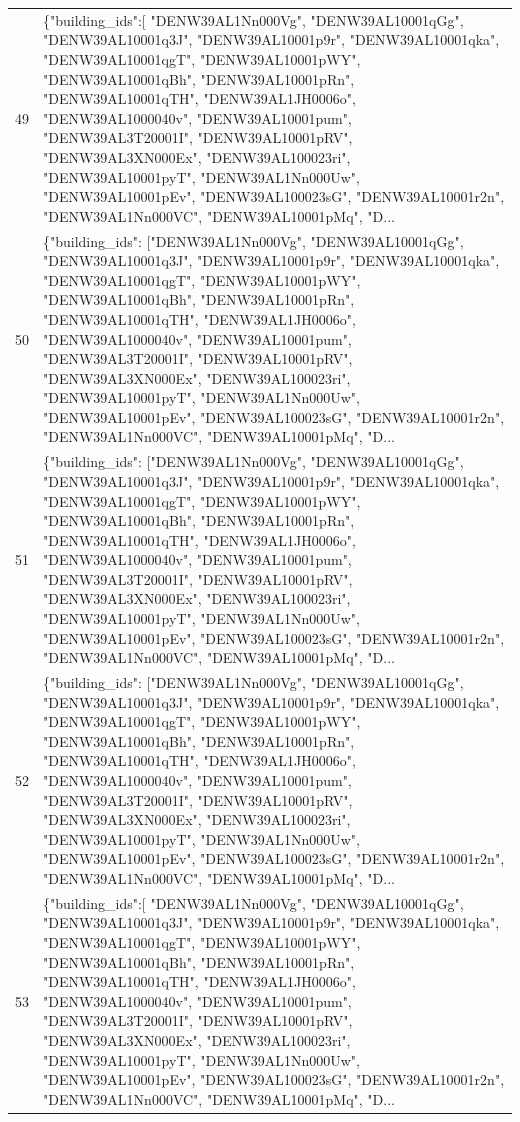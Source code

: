 \documentclass[a4paper,11pt]{article}
\begin{document}
\begin{table}[ht]
\begin{tabular}{r p{12cm}}
49 & \{"building\_ids":[ "DENW39AL1Nn000Vg", "DENW39AL10001qGg", "DENW39AL10001q3J", "DENW39AL10001p9r", "DENW39AL10001qka", "DENW39AL10001qgT", "DENW39AL10001pWY", "DENW39AL10001qBh", "DENW39AL10001pRn", "DENW39AL10001qTH", "DENW39AL1JH0006o", "DENW39AL1000040v", "DENW39AL10001pum", "DENW39AL3T20001I", "DENW39AL10001pRV", "DENW39AL3XN000Ex", "DENW39AL100023ri", "DENW39AL10001pyT", "DENW39AL1Nn000Uw", "DENW39AL10001pEv", "DENW39AL100023sG", "DENW39AL10001r2n", "DENW39AL1Nn000VC", "DENW39AL10001pMq", "D... \\
50 & \{"building\_ids": ["DENW39AL1Nn000Vg", "DENW39AL10001qGg", "DENW39AL10001q3J", "DENW39AL10001p9r", "DENW39AL10001qka", "DENW39AL10001qgT", "DENW39AL10001pWY", "DENW39AL10001qBh", "DENW39AL10001pRn", "DENW39AL10001qTH", "DENW39AL1JH0006o", "DENW39AL1000040v", "DENW39AL10001pum", "DENW39AL3T20001I", "DENW39AL10001pRV", "DENW39AL3XN000Ex", "DENW39AL100023ri", "DENW39AL10001pyT", "DENW39AL1Nn000Uw", "DENW39AL10001pEv", "DENW39AL100023sG", "DENW39AL10001r2n", "DENW39AL1Nn000VC", "DENW39AL10001pMq", "D... \\
51 & \{"building\_ids": ["DENW39AL1Nn000Vg", "DENW39AL10001qGg", "DENW39AL10001q3J", "DENW39AL10001p9r", "DENW39AL10001qka", "DENW39AL10001qgT", "DENW39AL10001pWY", "DENW39AL10001qBh", "DENW39AL10001pRn", "DENW39AL10001qTH", "DENW39AL1JH0006o", "DENW39AL1000040v", "DENW39AL10001pum", "DENW39AL3T20001I", "DENW39AL10001pRV", "DENW39AL3XN000Ex", "DENW39AL100023ri", "DENW39AL10001pyT", "DENW39AL1Nn000Uw", "DENW39AL10001pEv", "DENW39AL100023sG", "DENW39AL10001r2n", "DENW39AL1Nn000VC", "DENW39AL10001pMq", "D... \\
52 & \{"building\_ids": ["DENW39AL1Nn000Vg", "DENW39AL10001qGg", "DENW39AL10001q3J", "DENW39AL10001p9r", "DENW39AL10001qka", "DENW39AL10001qgT", "DENW39AL10001pWY", "DENW39AL10001qBh", "DENW39AL10001pRn", "DENW39AL10001qTH", "DENW39AL1JH0006o", "DENW39AL1000040v", "DENW39AL10001pum", "DENW39AL3T20001I", "DENW39AL10001pRV", "DENW39AL3XN000Ex", "DENW39AL100023ri", "DENW39AL10001pyT", "DENW39AL1Nn000Uw", "DENW39AL10001pEv", "DENW39AL100023sG", "DENW39AL10001r2n", "DENW39AL1Nn000VC", "DENW39AL10001pMq", "D... \\
53 & \{"building\_ids":[ "DENW39AL1Nn000Vg", "DENW39AL10001qGg", "DENW39AL10001q3J", "DENW39AL10001p9r", "DENW39AL10001qka", "DENW39AL10001qgT", "DENW39AL10001pWY", "DENW39AL10001qBh", "DENW39AL10001pRn", "DENW39AL10001qTH", "DENW39AL1JH0006o", "DENW39AL1000040v", "DENW39AL10001pum", "DENW39AL3T20001I", "DENW39AL10001pRV", "DENW39AL3XN000Ex", "DENW39AL100023ri", "DENW39AL10001pyT", "DENW39AL1Nn000Uw", "DENW39AL10001pEv", "DENW39AL100023sG", "DENW39AL10001r2n", "DENW39AL1Nn000VC", "DENW39AL10001pMq", "D... \\

\end{tabular}
\end{table}
\end{document}
